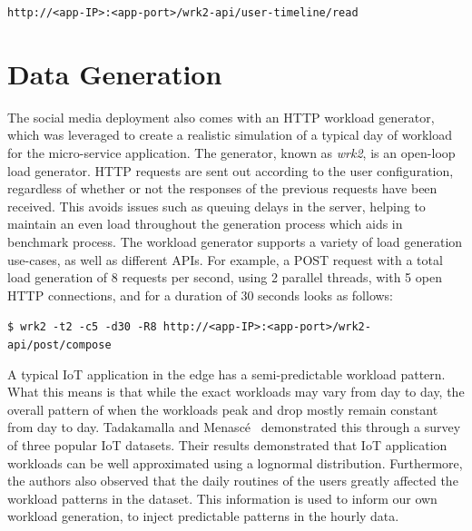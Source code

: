 \texttt{http://<app-IP>:<app-port>/wrk2-api/user-timeline/read}

\section{Data Generation}
\label{sec:ch5-data-generation}

The social media deployment also comes with an HTTP workload generator, which
was leveraged to create a realistic simulation of a typical day of workload for the micro-service application. The generator, known as \textit{wrk2}, is an open-loop load generator. HTTP requests are sent out according to the user configuration, regardless of whether or not the responses of the previous requests have been received. This avoids issues such as queuing delays in the server, helping to maintain an even load throughout the generation process which aids in benchmark process. The workload generator supports a variety of load generation use-cases, as well as different APIs. For example, a POST request with a total load generation of 8 requests per second, using 2 parallel threads, with 5 open HTTP connections, and for a duration of 30 seconds looks as follows:\par

\texttt{\$ wrk2 -t2 -c5 -d30 -R8 http://<app-IP>:<app-port>/wrk2-api/post/compose}

A typical IoT application in the edge has a semi-predictable workload pattern. What this means is that while the exact workloads may vary from day to day, the overall pattern of when the workloads peak and drop mostly remain constant from day to day. Tadakamalla and Menasc{\'e}~\cite{tadakamalla2019characterization} demonstrated this through a survey of three popular IoT datasets. Their results demonstrated that IoT application workloads can be well approximated using a lognormal distribution. Furthermore, the authors also observed that the daily routines of the users greatly affected the workload patterns in the dataset. This information is used to inform our own workload generation, to inject predictable patterns in the hourly data.\par

